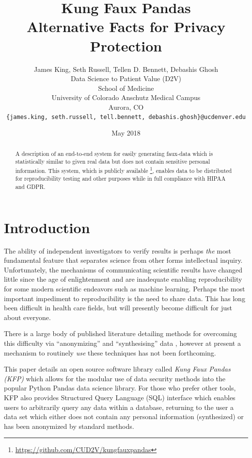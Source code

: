 \documentclass{article}
\title{%
  Kung Faux Pandas \\
  \large Alternative Facts for Privacy Protection %
  }
\author{
  James King, Seth Russell, Tellen D. Bennett, Debashis Ghosh\\
  Data Science to Patient Value (D2V)\\
  School of Medicine\\
  University of Colorado Anschutz Medical Campus\\
  Aurora, CO\\
  \texttt{\{james.king, seth.russell, tell.bennett, debashis.ghosh\}@ucdenver.edu}
  }
\date{May 2018}
\begin{document}

\maketitle

\begin{abstract}
A description of an end-to-end system for easily generating faux-data which is statistically similar to given real data but does not contain sensitive personal information.  This system, which is publicly available \footnote{\url{https://github.com/CUD2V/kungfauxpandas}}, enables data to be distributed for reproducibility testing and other purposes while in full compliance with HIPAA and GDPR.
\end{abstract}


\section{Introduction}

The ability of independent investigators to verify results is perhaps \emph{the} most fundamental feature that separates science from other forms intellectual inquiry.  Unfortunately, the mechanisms of communicating scientific results have changed little since the age of enlightenment and are inadequate enabling reproducibility for some modern scientific endeavors such as machine learning.  Perhaps the most important impediment to reproducibility is the need to share data.  This has long been difficult in health care fields, but will presently become difficult for just about everyone.

There is a large body of published literature detailing methods for overcoming this difficulty via ``anonymizing'' and ``synthesising'' data \cite{patki_synthetic_2016, choi_generating_2017}, however at present a mechanism to routinely \emph{use} these techniques has not been forthcoming.

This paper details an open source software library called \emph{Kung Faux Pandas (KFP)} which allows for the modular use of data security methods into the popular Python Pandas data science library. For those who prefer other tools, KFP also provides Structured Query Language (SQL) interface which enables users to arbitrarily query any data within a database, returning to the user a data set which either does not contain any personal information (synthesized) or has been anonymized by standard methods.
\end{document}
